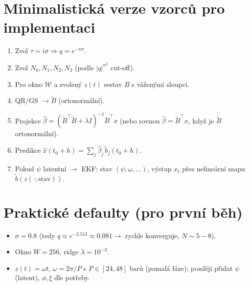\documentclass[12pt, a4paper]{article}
\begin{document}
\section{Minimalistická verze vzorců pro implementaci}
\begin{enumerate}
    \item Zvol $\tau=i\sigma \Rightarrow q=e^{-\pi\sigma}$.
    \item Zvol $N_0,N_1,N_2,N_3$ (podle $|q|^{n^2}$ cut-off).
    \item Pro okno $\mathcal{W}$ a zvolený $z(t)$ sestav $B$ s váženými sloupci.
    \item QR/GS $\rightarrow \tilde{B}$ (ortonormální).
    \item Projekce $\hat\beta = (\tilde{B}^\top\tilde{B}+\lambda I)^{-1}\tilde{B}^\top x$ (nebo rovnou $\hat\beta = \tilde{B}^\top x$, když je $\tilde{B}$ ortonormální).
    \item Predikce $\hat{x}(t_0+h) = \sum_j \hat\beta_j\, \tilde{b}_j(t_0+h)$.
    \item Pokud $\psi$ latentní $\rightarrow$ EKF: stav $(\psi,\omega,\ldots)$, výstup $x_t$ přes nelineární mapu $\tilde{b}(z(\cdot;\text{stav}))$.
\end{enumerate}

\section{Praktické defaulty (pro první běh)}
\begin{itemize}
    \item $\sigma = 0.8$ (tedy $q\approx e^{-2.513}\approx 0.081 \rightarrow$ rychle konverguje, $N\sim 5-8$).
    \item Okno $W=256$, ridge $\lambda=10^{-3}$.
    \item $z(t) = \omega t$, $\omega = 2\pi / P$ s $P \in [24, 48]$ barů (pomalá fáze); později přidat $\psi$ (latent), $\phi, \xi$ dle potřeby.
\end{itemize}
\end{document}
